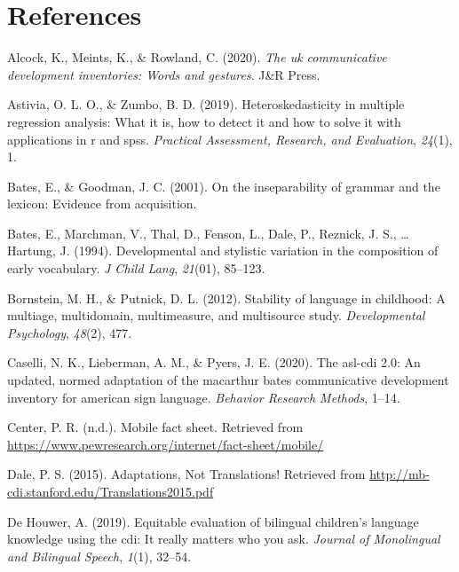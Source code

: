 \documentclass[
  english,
  ,man,floatsintext]{apa6}
\begin{document}
\newpage

\hypertarget{references}{%
\section{References}\label{references}}

\begingroup
\setlength{\parindent}{-0.5in}
\setlength{\leftskip}{0.5in}

\hypertarget{refs}{}
\leavevmode\hypertarget{ref-Alcock2020}{}%
Alcock, K., Meints, K., \& Rowland, C. (2020). \emph{The uk communicative development inventories: Words and gestures}. J\&R Press.

\leavevmode\hypertarget{ref-Astivia2019}{}%
Astivia, O. L. O., \& Zumbo, B. D. (2019). Heteroskedasticity in multiple regression analysis: What it is, how to detect it and how to solve it with applications in r and spss. \emph{Practical Assessment, Research, and Evaluation}, \emph{24}(1), 1.

\leavevmode\hypertarget{ref-Bates2001}{}%
Bates, E., \& Goodman, J. C. (2001). On the inseparability of grammar and the lexicon: Evidence from acquisition.

\leavevmode\hypertarget{ref-bates1994}{}%
Bates, E., Marchman, V., Thal, D., Fenson, L., Dale, P., Reznick, J. S., \ldots{} Hartung, J. (1994). Developmental and stylistic variation in the composition of early vocabulary. \emph{J Child Lang}, \emph{21}(01), 85--123.

\leavevmode\hypertarget{ref-bornstein2012}{}%
Bornstein, M. H., \& Putnick, D. L. (2012). Stability of language in childhood: A multiage, multidomain, multimeasure, and multisource study. \emph{Developmental Psychology}, \emph{48}(2), 477.

\leavevmode\hypertarget{ref-Caselli2020}{}%
Caselli, N. K., Lieberman, A. M., \& Pyers, J. E. (2020). The asl-cdi 2.0: An updated, normed adaptation of the macarthur bates communicative development inventory for american sign language. \emph{Behavior Research Methods}, 1--14.

\leavevmode\hypertarget{ref-Center2019}{}%
Center, P. R. (n.d.). Mobile fact sheet. Retrieved from \url{https://www.pewresearch.org/internet/fact-sheet/mobile/}

\leavevmode\hypertarget{ref-dale2015}{}%
Dale, P. S. (2015). Adaptations, Not Translations! Retrieved from \url{http://mb-cdi.stanford.edu/Translations2015.pdf}

\leavevmode\hypertarget{ref-DeHouwer2019}{}%
De Houwer, A. (2019). Equitable evaluation of bilingual children's language knowledge using the cdi: It really matters who you ask. \emph{Journal of Monolingual and Bilingual Speech}, \emph{1}(1), 32--54.
\end{document}
